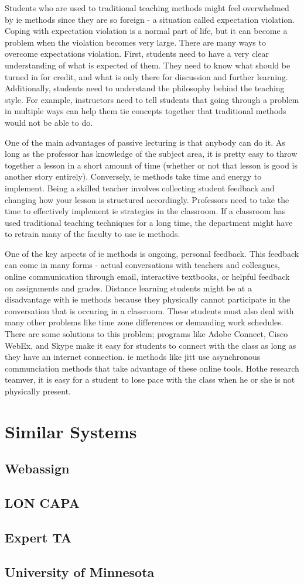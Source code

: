 Students who are used to traditional teaching methods might feel overwhelmed by \gls{ie} methods since they are so foreign - a situation called expectation violation. Coping with expectation violation is a normal part of life, but it can become a problem when the violation becomes very large. There are many ways to overcome expectations violation. First, students need to have a very clear understanding of what is expected of them. They need to know what should be turned in for credit, and what is only there for discussion and further learning. Additionally, students need to understand the philosophy behind the teaching style. For example, instructors need to tell students that going through a problem in multiple ways can help them tie concepts together that traditional methods would not be able to do.

One of the main advantages of passive lecturing is that anybody can do it. As long as the professor has knowledge of the subject area, it is pretty easy to throw together a lesson in a short amount of time (whether or not that lesson is good is another story entirely). Conversely, \gls{ie} methods take time and energy to implement. Being a skilled teacher involves collecting student feedback and changing how your lesson is structured accordingly. Professors need to take the time to effectively implement \gls{ie} strategies in the classroom. If a classroom has used traditional teaching techniques for a long time, the department might have to retrain many of the faculty to use \gls{ie} methods.

One of the key aspects of \gls{ie} methods is ongoing, personal feedback. This feedback can come in many forms - actual conversations with teachers and colleagues, online communication through email, interactive textbooks, or helpful feedback on assignments and grades. Distance learning students might be at a disadvantage with \gls{ie} methods because they physically cannot participate in the conversation that is occuring in a classroom. These students must also deal with many other problems like time zone differences or demanding work schedules. There are some solutions to this problem; programs like Adobe Connect, Cisco WebEx, and Skype make it easy for students to connect with the class as long as they have an internet connection. \gls{ie} methods like \gls{jitt} use asynchronous communciation methods that take advantage of these online tools. Hothe research teamver, it is easy for a student to lose pace with the class when he or she is not physically present.

\section{Similar Systems}

\subsection{Webassign}
\subsection{LON CAPA}
\subsection{Expert TA}
\subsection{University of Minnesota}
